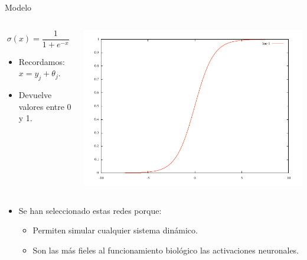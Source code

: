 \documentclass[aspectratio=169]{beamer}
\begin{document}
\begin{frame}{Modelo}
  \begin{columns}
    \begin{column}{0.47\textwidth}
      \begin{equation*}
        \sigma (x)=\frac{1}{1+e^{-x}}
      \end{equation*}
        \begin{itemize}
          \item Recordamos: $x = y_{j} + \theta_{j}$.
          \item Devuelve valores entre 0 y 1.
        \end{itemize}
    \end{column}
    \begin{column}{0.5\textwidth}
      \includegraphics[width=1.0\textwidth,height=.50\textheight]{Imagenes/Sigmoid}
    \end{column}
  \end{columns}
  \begin{itemize}
    \item Se han seleccionado estas redes porque:
    \begin{itemize}
      \item Permiten simular cualquier sistema dinámico.
      \item Son las más fieles al funcionamiento biológico las activaciones neuronales.
    \end{itemize}
  \end{itemize}
\end{frame}
\end{document}
